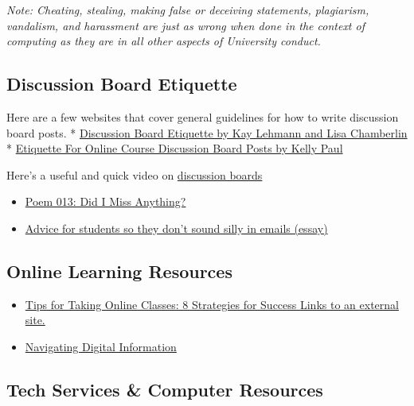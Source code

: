 \documentclass[
]{book}
\begin{document}
\emph{Note: Cheating, stealing, making false or deceiving statements, plagiarism, vandalism, and harassment are just as wrong when done in the context of computing as they are in all other aspects of University conduct.}

\subsection{Discussion Board Etiquette}\label{discussion-board-etiquette}

Here are a few websites that cover general guidelines for how to write discussion board posts.
* \href{https://www2.uwstout.edu/content/profdev/rubrics/discuss_etiquette.html}{Discussion Board Etiquette by Kay Lehmann and Lisa Chamberlin}
* \href{http://learnmore.uncg.edu/blog/etiquette-for-online-course-discussion-boards}{Etiquette For Online Course Discussion Board Posts by Kelly Paul}

Here's a useful and quick video on \href{https://www.youtube.com/watch?v=tg3y2A9pdtI}{discussion boards}

\begin{itemize}
\item
  \href{https://www.loc.gov/programs/poetry-and-literature/poet-laureate/poet-laureate-projects/poetry-180/all-poems/item/poetry-180-013/did-i-miss-anything/}{Poem 013: Did I Miss Anything?}
\item
  \href{https://www.insidehighered.com/views/2015/04/16/advice-students-so-they-dont-sound-silly-emails-essay}{Advice for students so they don't sound silly in emails (essay)}
\end{itemize}

\subsection{Online Learning Resources}\label{online-learning-resources}

\begin{itemize}
\item
  \href{https://www.northeastern.edu/graduate/blog/tips-for-taking-online-classes/}{Tips for Taking Online Classes: 8 Strategies for Success Links to an external site.}
\item
  \href{https://www.youtube.com/watch?v=pLlv2o6UfTU&list=PL8dPuuaLjXtN07XYqqWSKpPrtNDiCHTzU}{Navigating Digital Information}
\end{itemize}

\subsection{Tech Services \& Computer Resources}\label{tech-services-computer-resources}
\end{document}
